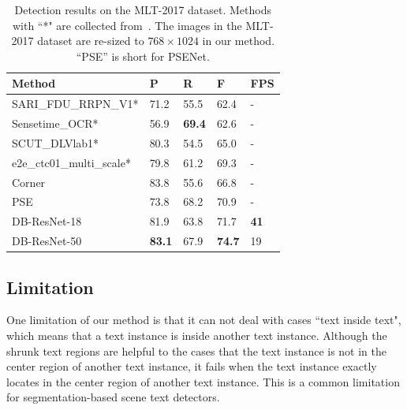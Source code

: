 \documentclass[letterpaper]{article} %
\begin{document}
\begin{table}[!ht]
\centering
\caption{Detection results on the MLT-2017 dataset. Methods with ``*" are collected from~\cite{lyu2018multi}. The images in the MLT-2017 dataset are re-sized to $768 \times 1024$ in our method. ``PSE'' is short for PSENet.}
\begin{tabularx}{1.0\linewidth}{@{}l*{4}X@{}}
\toprule
Method        & P             & R             & F             & FPS         \\ \midrule
SARI\_FDU\_RRPN\_V1*       & 71.2            & 55.5            & 62.4            & -         \\ 
Sensetime\_OCR*       & 56.9            & \textbf{69.4}            & 62.6            & -         \\ 
SCUT\_DLVlab1*     & 80.3            & 54.5         & 65.0          & -           \\ 
e2e\_ctc01\_multi\_scale*    & 79.8          & 61.2          & 69.3          & -         \\ 
Corner~\cite{lyu2018multi}          & 83.8          & 55.6          & 66.8          & -        \\ 
PSE~\cite{wang2019shape}          & 73.8            & 68.2            & 70.9            & -         \\ 
\midrule  
DB-ResNet-18 & 81.9          & 63.8          & 71.7          & \textbf{41} \\ 
DB-ResNet-50 & \textbf{83.1} & 67.9 & \textbf{74.7} & 19          \\ \bottomrule
\end{tabularx}
\label{tab:mlt}
\end{table}



\subsection{Limitation}
One limitation of our method is that it can not deal with cases ``text inside text", which means that a text instance is inside another text instance.
Although the shrunk text regions are helpful to the cases that the text instance is not in the center region of another text instance, it fails when the text instance exactly locates in the center region of another text instance. This is a common limitation for segmentation-based scene text detectors.
\end{document}
